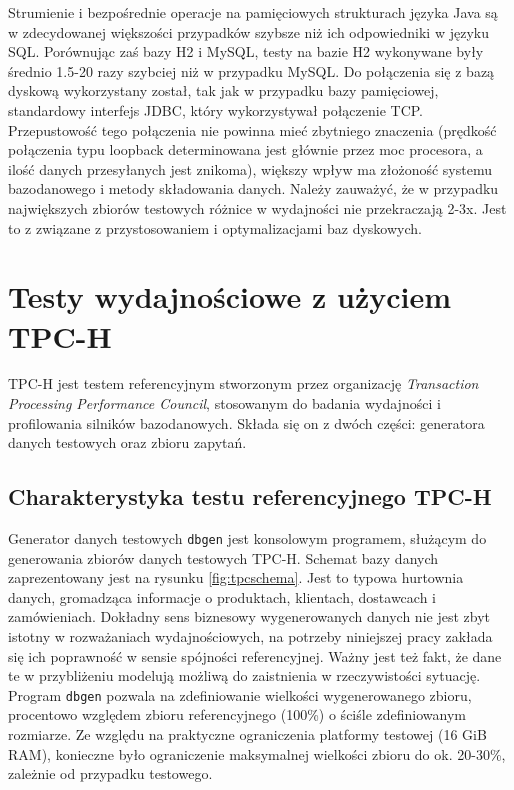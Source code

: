\documentclass[12pt,twoside,openright]{extarticle}
\let\oldsection\section%
\renewcommand{\section}{\cleardoublepage\oldsection}%
\begin{document}
    Strumienie i bezpośrednie operacje na pamięciowych strukturach języka Java są w zdecydowanej większości przypadków szybsze niż ich odpowiedniki w języku SQL. Porównując zaś bazy H2 i MySQL, testy na bazie H2 wykonywane były średnio 1.5-20 razy szybciej niż w przypadku MySQL.  Do połączenia się z bazą dyskową wykorzystany został, tak jak w przypadku bazy pamięciowej, standardowy interfejs JDBC, który wykorzystywał połączenie TCP. Przepustowość tego połączenia nie powinna mieć zbytniego znaczenia (prędkość połączenia typu loopback determinowana jest głównie przez moc procesora, a ilość danych przesyłanych jest znikoma), większy wpływ ma złożoność systemu bazodanowego i metody składowania danych. Należy zauważyć, że w przypadku największych zbiorów testowych różnice w wydajności nie przekraczają 2-3x. Jest to z związane z przystosowaniem i optymalizacjami baz dyskowych.


\section{Testy wydajnościowe z użyciem TPC-H} \label{tpc}

    TPC-H jest testem referencyjnym stworzonym przez organizację \textit{Transaction Processing Performance Council}, stosowanym do badania wydajności i profilowania silników bazodanowych. Składa się on z dwóch części: generatora danych testowych oraz zbioru zapytań.

\subsection{Charakterystyka testu referencyjnego TPC-H}

    Generator danych testowych \texttt{dbgen} jest konsolowym programem, służącym do generowania zbiorów danych testowych TPC-H. Schemat bazy danych zaprezentowany jest na rysunku \ref{fig:tpcschema}. Jest to typowa hurtownia danych, gromadząca informacje o produktach, klientach, dostawcach i zamówieniach. Dokładny sens biznesowy wygenerowanych danych nie jest zbyt istotny w rozważaniach wydajnościowych, na potrzeby niniejszej pracy zakłada się ich poprawność w sensie spójności referencyjnej. Ważny jest też fakt, że dane te w przybliżeniu modelują możliwą do zaistnienia w rzeczywistości sytuację. Program \texttt{dbgen} pozwala na zdefiniowanie wielkości wygenerowanego zbioru, procentowo względem zbioru referencyjnego (100\%) o ściśle zdefiniowanym rozmiarze.  Ze względu na praktyczne ograniczenia platformy testowej (16 GiB RAM), konieczne było ograniczenie maksymalnej wielkości zbioru do ok. 20-30\%, zależnie od przypadku testowego. 
\end{document}
